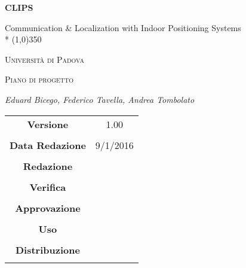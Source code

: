 \documentclass[a4paper,12pt]{article}
\author{Eduard Bicego, Federico Tavella, Andrea Tombolato}
\date{05/01/2016}
\begin{document}
\begin{titlepage}
	\centering
	{\huge\bfseries CLIPS\par}
	Communication \& Localization with Indoor Positioning Systems \\*
	\line(1,0){350} \\
	{\scshape\LARGE Università di Padova \par}
	\vspace{1cm}
	{\scshape\Large Piano di progetto\par}
	\vspace{1.5cm}
	
	\vspace{2cm}
	{\Large\itshape Eduard Bicego, Federico Tavella, Andrea Tombolato\par}
	
	\vfill \vfill
	\begin{tabular}{c|c}
		{\hfill \textbf{Versione}} 			& 1.00				\\ \\
		{\hfill\textbf{Data Redazione}} 	& 9/1/2016  		\\ \\
		{\hfill\textbf{Redazione}} 			&  					\\ \\
		{\hfill\textbf{Verifica}} 			&  					\\ \\
		{\hfill\textbf{Approvazione}} 		&  					\\ \\
		{\hfill\textbf{Uso}} 				& 					\\ \\
		{\hfill\textbf{Distribuzione}} 		& 					\\ \\
	\end{tabular}
\end{titlepage}
	
	\newpage

	\tableofcontents 	%
	\listoftables 		%
	\listoffigures		%
	
	\label{LastFrontPage}
	

	\newpage
	
	\pagestyle{mymain}
	
	\newpage
		

	\newpage
		
		
	\newpage
			

    \newpage
		
        
    \newpage
		
		
	\label{LastPage}
\end{document}
